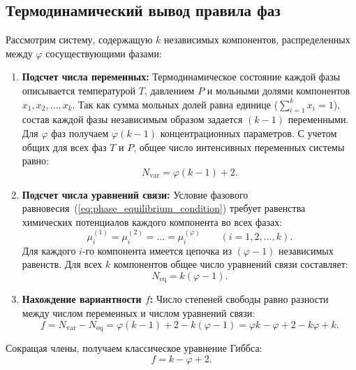 \documentclass[12pt,a4paper]{article}
\begin{document}
\subsection{Термодинамический вывод правила фаз}
Рассмотрим систему, содержащую $k$ независимых компонентов, распределенных между $\varphi$ сосуществующими фазами:
\begin{enumerate}
    \item \textbf{Подсчет числа переменных:}
    Термодинамическое состояние каждой фазы описывается температурой $T$, давлением $P$ и мольными долями компонентов $x_{1}, x_{2}, \dots, x_{k}$. Так как сумма мольных долей равна единице ($\sum_{i=1}^k x_i = 1$), состав каждой фазы независимым образом задается $(k - 1)$ переменными. Для $\varphi$ фаз получаем $\varphi(k - 1)$ концентрационных параметров. 
    С учетом общих для всех фаз $T$ и $P$, общее число интенсивных переменных системы равно:
    \begin{equation}
    N_{\mathrm{var}} = \varphi(k - 1) + 2.
    \end{equation}
    \item \textbf{Подсчет числа уравнений связи:}
    Условие фазового равновесия~(\ref{eq:phase_equilibrium_condition}) требует равенства химических потенциалов каждого компонента во всех фазах:
    \begin{equation}
    \mu_i^{(1)} = \mu_i^{(2)} = \dots = \mu_i^{(\varphi)} \qquad (i = 1, 2, \dots, k).
    \end{equation}
    Для каждого $i$-го компонента имеется цепочка из $(\varphi - 1)$ независимых равенств. Для всех $k$ компонентов общее число уравнений связи составляет:
    \begin{equation}
    N_{\mathrm{eq}} = k(\varphi - 1).
    \end{equation}
    \item \textbf{Нахождение вариантности $f$:}
    Число степеней свободы равно разности между числом переменных и числом уравнений связи:
    \begin{equation}
    f = N_{\mathrm{var}} - N_{\mathrm{eq}} = \varphi(k - 1) + 2 - k(\varphi - 1) = \varphi k - \varphi + 2 - k\varphi + k.
    \end{equation}
\end{enumerate}

Сокращая члены, получаем классическое уравнение Гиббса:
\begin{equation}
f = k - \varphi + 2.
\label{eq:gibbs_phase_rule}
\end{equation}
\end{document}

